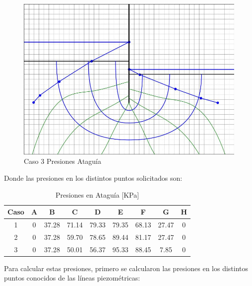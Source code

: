 \begin{figure}[H]
\begin{minipage}{0.32\textwidth}
      \includegraphics[width=\textwidth]{FOTOS/caso_3_presion_ataquia_total.jpg}
      \caption{Caso 3 Presiones Ataguía}
  \end{minipage}
\end{figure}

Donde las presiones en los distintos puntos solicitados son:

\begin{table}[H]
  \centering
  \begin{tabular}{|c|c|c|c|c|c|c|c|c|}
    \hline
    Caso & A & B & C & D & E & F & G & H \\
    \hline
    1 & 0 & 37.28 & 71.14 & 79.33 & 79.35 & 68.13 & 27.47 & 0 \\ \hline
    2 & 0 & 37.28 & 59.70 & 78.65 & 89.44 & 81.17 & 27.47 & 0 \\ \hline
    3 & 0 & 37.28 & 50.01 & 56.37 & 95.33 & 88.45 & 7.85 & 0 \\
    \hline
  \end{tabular}
  \caption{Presiones en Ataguía [KPa]}
\end{table}

Para calcular estas presiones, primero se calcularon las presiones en los distintos puntos conocidos de las líneas piezométricas:

